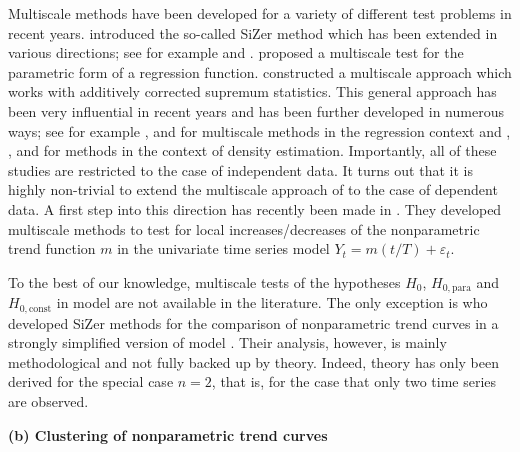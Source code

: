 \documentclass[a4paper,12pt]{article}
\makeatletter
\renewcommand{\eqref}[1]{\tagform@{\ref{#1}}}
\makeatother
\begin{document}
Multiscale methods have been developed for a variety of different test problems in recent years. \cite{ChaudhuriMarron1999, ChaudhuriMarron2000} introduced the so-called SiZer method which has been extended in various directions; see for example \cite{HannigMarron2006} and \cite{Rondonotti2007}. \cite{HorowitzSpokoiny2001} proposed a multiscale test for the parametric form of a regression function. \cite{DuembgenSpokoiny2001} constructed a multiscale approach which works with additively corrected supremum statistics. This general approach has been very influential in recent years and has been further developed in numerous ways; see for example \cite{Duembgen2002}, \cite{Rohde2008} and \cite{ProkschWernerMunk2018} for multiscale methods in the regression context and \cite{DuembgenWalther2008}, \cite{RufibachWalther2010}, \cite{SchmidtHieber2013} and \cite{EckleBissantzDette2017} for methods in the context of density estimation. Importantly, all of these studies are restricted to the case of independent data. It turns out that it is highly non-trivial to extend the multiscale approach of \cite{DuembgenSpokoiny2001} to the case of dependent data. A first step into this direction has recently been made in \cite{KhismatullinaVogt2020}. They developed multiscale methods to test for local increases/decreases of the nonparametric trend function $m$ in the univariate time series model $Y_t = m(t/T) + \varepsilon_t$.  


To the best of our knowledge, multiscale tests of the hypotheses $H_0$, $H_{0,\text{para}}$ and $H_{0,\text{const}}$ in model \eqref{model} are not available in the literature. The only exception is \cite{Park2009} who developed SiZer methods for the comparison of nonparametric trend curves in a strongly simplified version of model \eqref{model}. Their analysis, however, is mainly methodological and not fully backed up by theory. Indeed, theory has only been derived for the special case $n=2$, that is, for the case that only two time series are observed. 
\vspace{10pt}


\noindent \textbf{(b) Clustering of nonparametric trend curves} 
\vspace{10pt} 
\end{document}
